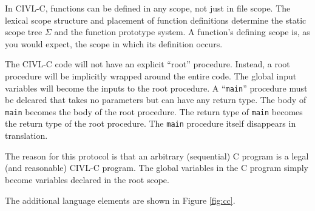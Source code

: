 \documentclass[11pt, oneside, letterpaper]{book}
\begin{document}
In CIVL-C, functions can be defined in any scope, not just in file
scope.  The lexical scope structure and placement of function
definitions determine the static scope tree $\Sigma$ and the function
prototype system.  A function's defining scope is, as you would
expect, the scope in which its definition occurs.

The CIVL-C code will not have an explicit ``root'' procedure.
Instead, a root procedure will be implicitly wrapped around the entire
code.  The global input variables will become the inputs to the root
procedure.  A ``\texttt{main}'' procedure must be delcared that takes
no parameters but can have any return type.  The body of \texttt{main}
becomes the body of the root procedure.  The return type of
\texttt{main} becomes the return type of the root procedure.  The
\texttt{main} procedure itself disappears in translation.

The reason for this protocol is that an arbitrary (sequential) C program
is a legal (and reasonable) CIVL-C program.  The global variables in the
C program simply become variables declared in the root scope.

The additional language elements are shown in Figure \ref{fig:cc}.
\end{document}
